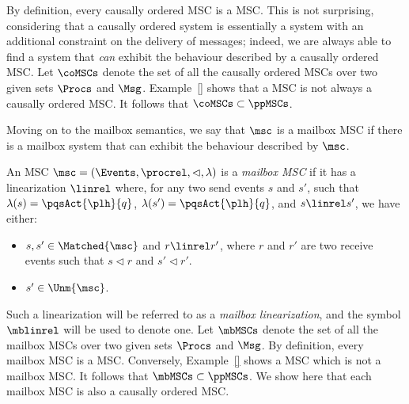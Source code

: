 By definition, every causally ordered MSC is a \pp MSC. This is not surprising, considering that a causally ordered system is essentially a \pp system with an additional constraint on the delivery of messages; indeed, we are always able to find a \pp system that \emph{can} exhibit the behaviour described by a causally ordered MSC. Let $\coMSCs$ denote the set of all the causally ordered MSCs over two given sets $\Procs$ and $\Msg$. Example~\ref{} shows that a \pp MSC is not always a causally ordered MSC. It follows that $\coMSCs \subset \ppMSCs$.

\medskip

Moving on to the mailbox semantics, we say that $\msc$ is a mailbox MSC if there is a mailbox system that can exhibit the behaviour described by $\msc$.

\begin{definition}%
An MSC $\msc = (\Events,\procrel,\lhd,\lambda)$ is a \emph{mailbox MSC} if it has a linearization $\linrel$ where, for any two send events $s$ and $s'$, such that $\lambda(s)=\pqsAct{\plh}{q}$, $\lambda(s')=\pqsAct{\plh}{q}$, and $s \linrel s'$, we have either:
\begin{itemize}\itemsep=0.5ex
	\item $s,s' \in \Matched{\msc}$ and $r \linrel r'$, where $r$ and $r'$ are two receive events such that $s \lhd r$ and $s' \lhd r'$.
	\item $s' \in \Unm{\msc}$.
\end{itemize}
\end{definition}

Such a linearization will be referred to as a \emph{mailbox linearization}, and the symbol $\mblinrel$ will be used to denote one. Let $\mbMSCs$ denote the set of all the mailbox MSCs over two given sets $\Procs$ and $\Msg$. By definition, every mailbox MSC is a \pp MSC. Conversely, Example~\ref{} shows a \pp MSC which is not a mailbox MSC. It follows that $\mbMSCs \subset \ppMSCs$. We show here that each mailbox MSC is also a causally ordered MSC.

